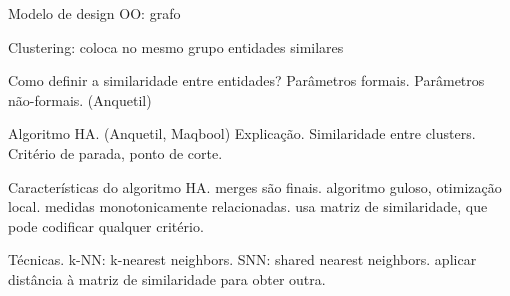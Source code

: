 Modelo de design OO: grafo

Clustering: coloca no mesmo grupo entidades similares

Como definir a similaridade entre entidades?
  Parâmetros formais.
  Parâmetros não-formais. (Anquetil)

Algoritmo HA. (Anquetil, Maqbool)
  Explicação.
  Similaridade entre clusters.
  Critério de parada, ponto de corte.

Características do algoritmo HA.
  merges são finais.
  algoritmo guloso, otimização local.
  medidas monotonicamente relacionadas.
  usa matriz de similaridade, que pode codificar qualquer critério.

Técnicas.
  k-NN: k-nearest neighbors.
  SNN: shared nearest neighbors.
  aplicar distância à matriz de similaridade para obter outra.

